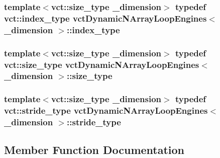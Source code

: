 \subsubsection[{index\+\_\+type}]{\setlength{\rightskip}{0pt plus 5cm}template$<$vct\+::size\+\_\+type \+\_\+dimension$>$ typedef {\bf vct\+::index\+\_\+type} {\bf vct\+Dynamic\+N\+Array\+Loop\+Engines}$<$ \+\_\+dimension $>$\+::{\bf index\+\_\+type}}\label{classvct_dynamic_n_array_loop_engines_a072f02e39fa5ce2bfeb95aa4164ce813}
\hypertarget{classvct_dynamic_n_array_loop_engines_ab1f5ac52c9289b164e4ca3d37c9c857c}{}
\subsubsection[{size\+\_\+type}]{\setlength{\rightskip}{0pt plus 5cm}template$<$vct\+::size\+\_\+type \+\_\+dimension$>$ typedef {\bf vct\+::size\+\_\+type} {\bf vct\+Dynamic\+N\+Array\+Loop\+Engines}$<$ \+\_\+dimension $>$\+::{\bf size\+\_\+type}}\label{classvct_dynamic_n_array_loop_engines_ab1f5ac52c9289b164e4ca3d37c9c857c}
\hypertarget{classvct_dynamic_n_array_loop_engines_ae9b281249bae381156d7a354a06e7650}{}
\subsubsection[{stride\+\_\+type}]{\setlength{\rightskip}{0pt plus 5cm}template$<$vct\+::size\+\_\+type \+\_\+dimension$>$ typedef {\bf vct\+::stride\+\_\+type} {\bf vct\+Dynamic\+N\+Array\+Loop\+Engines}$<$ \+\_\+dimension $>$\+::{\bf stride\+\_\+type}}\label{classvct_dynamic_n_array_loop_engines_ae9b281249bae381156d7a354a06e7650}


\subsection{Member Function Documentation}
\hypertarget{classvct_dynamic_n_array_loop_engines_a6d983fd04968226618130831bcf39876}{}
